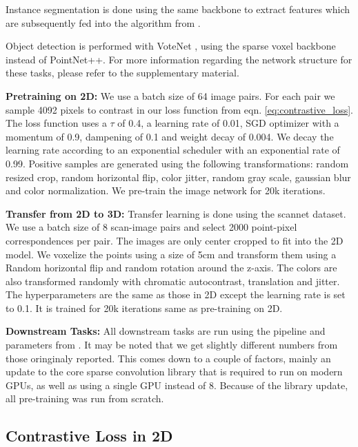 \documentclass[10pt,twocolumn,letterpaper]{article}
\begin{document}
Instance segmentation is done using the same backbone to extract features which are subsequently fed into the algorithm from \cite{jiang2020pointgroup}.

Object detection is performed with VoteNet \cite{qi2019deep}, using the sparse voxel backbone instead of PointNet++. For more information regarding the network structure for these tasks, please refer to the supplementary material.

\textbf{Pretraining on 2D:} We use a batch size of 64 image pairs. For each pair we sample 4092 pixels to contrast in our loss function from eqn. \ref{eq:contrastive_loss}. The loss function uses a $\tau$ of 0.4, a learning rate of 0.01, SGD optimizer with a momentum of 0.9, dampening of 0.1 and weight decay of 0.004. We decay the learning rate according to an exponential scheduler with an exponential rate of 0.99. Positive samples are generated using the following transformations: random resized crop, random horizontal flip, color jitter, random gray scale, gaussian blur and color normalization. We pre-train the image network for 20k iterations.

\textbf{Transfer from 2D to 3D:} Transfer learning is done using the scannet dataset. We use a batch size of 8 scan-image pairs and select 2000 point-pixel correspondences per pair. The images are only center cropped to fit into the 2D model. We voxelize the points using a size of 5cm and transform them using a Random horizontal flip and random rotation around the z-axis. The colors are also transformed randomly with chromatic autocontrast, translation and jitter. The hyperparameters are the same as those in 2D except the learning rate is set to 0.1. It is trained for 20k iterations same as pre-training on 2D.

\textbf{Downstream Tasks:} All downstream tasks are run using the pipeline and parameters from \cite{hou2021Exploring}. It may be noted that we get slightly different numbers from those oringinaly reported. This comes down to a couple of factors, mainly an update to the core sparse convolution library that is required to run on modern GPUs, as well as using a single GPU instead of 8. Because of the library update, all pre-training was run from scratch.


\subsection{Contrastive Loss in 2D}
\label{sec:results:2d}
\end{document}
